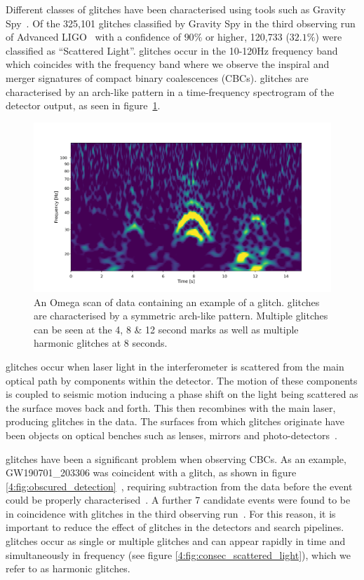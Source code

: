 Different classes of glitches have been characterised using tools such as Gravity Spy~\cite{gravityspy:2017, gravityspy:2023}. Of the 325,101 glitches classified by Gravity Spy in the third observing run of Advanced LIGO~\cite{gravityspy:2021} with a confidence of $90\%$ or higher, 120,733 ($32.1\%$) were classified as ``Scattered Light''. \Scl{} glitches occur in the 10-120Hz frequency band~\cite{reducing_scattering:2020} which coincides with the frequency band where we observe the inspiral and merger signatures of compact binary coalescences (CBCs). \Scl{} glitches are characterised by an arch-like pattern in a time-frequency spectrogram of the detector output, as seen in figure~\ref{4:fig:scattered_light}. 
%
\begin{figure}
  \includegraphics[width=\textwidth]{images/4_archenemy/Section1/single_stack.pdf}
  \caption{An Omega scan \cite{gwdetchar_tools:2021} of \gw{} data containing an example of a \scl{} glitch. \Scl{} glitches are characterised by a symmetric arch-like pattern. Multiple \scl{} glitches can be seen at the 4, 8 \& 12 second marks as well as multiple harmonic glitches at 8 seconds.}
  \label{4:fig:scattered_light}
\end{figure}
%
\Scl{} glitches occur when laser light in the interferometer is scattered from the main optical path by components within the detector. The motion of these components is coupled to seismic motion inducing a phase shift on the light being scattered as the surface moves back and forth. This \scl{} then recombines with the main laser, producing \scl{} glitches in the data. The surfaces from which \scl{} glitches originate have been objects on optical benches such as lenses, mirrors and photo-detectors~\cite{TAccadia:2010}.

\Scl{} glitches have been a significant problem when observing CBCs. As an example, GW190701\_203306 was coincident with a \scl{} glitch, as shown in figure \ref{4:fig:obscured_detection}~\cite{gwtc2:2021}, requiring subtraction from the data before the event could be properly characterised~\cite{O3_subtraction:2022}. A further 7 candidate events were found to be in coincidence with \scl{} glitches in the third observing run~\cite{gwtc3:2023}. For this reason, it is important to reduce the effect of \scl{} glitches in the detectors and \gw{} search pipelines. \Scl{} glitches occur as single or multiple glitches and can appear rapidly in time and simultaneously in frequency (see figure \ref{4:fig:consec_scattered_light}), which we refer to as harmonic glitches.

